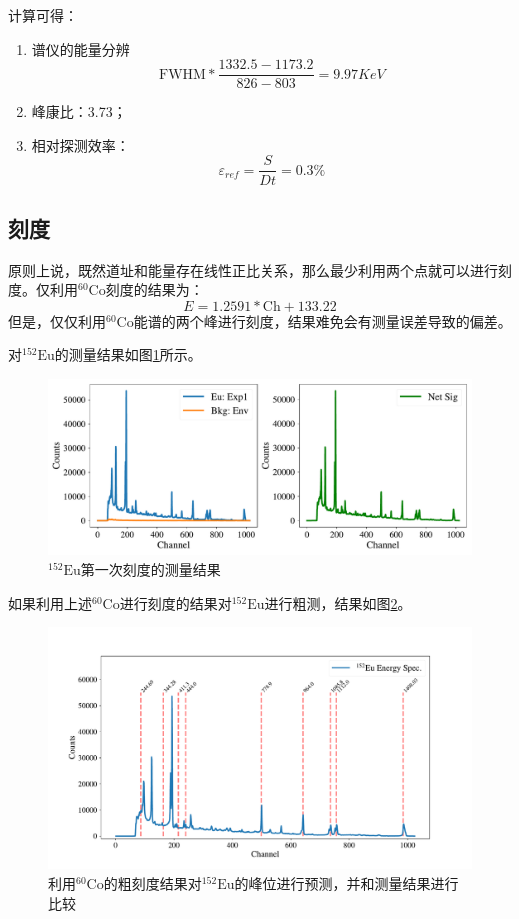 \documentclass{article}
\begin{document}
计算可得：
\begin{enumerate}
    \item 谱仪的能量分辨
    \begin{equation}
        \text{FWHM}*\frac{1332.5-1173.2}{826-803} = 9.97\si{KeV}
    \end{equation}
\item 峰康比：3.73；
\item 相对探测效率：
\begin{equation}
    \varepsilon_{ref} = \frac{S}{Dt} = 0.3\%
\end{equation}
\end{enumerate}
\subsection{刻度}
原则上说，既然道址和能量存在线性正比关系，那么最少利用两个点就可以进行刻度。仅利用$^{60}\text{Co}$刻度的结果为：
\begin{equation}
    E = 1.2591*\text{Ch} + 133.22
\end{equation}
但是，仅仅利用$^{60}\text{Co}$能谱的两个峰进行刻度，结果难免会有测量误差导致的偏差。

对$^{152}\text{Eu}$的测量结果如图\ref{fig:152Eu_Full}所示。
\begin{figure}[htbp]
    \centering
    \includegraphics[width=\textwidth]{../plots/Eu_full_net.pdf}
    \caption{$^{152}\text{Eu}$第一次刻度的测量结果\label{fig:152Eu_Full}}
\end{figure}

如果利用上述$^{60}\text{Co}$进行刻度的结果对$^{152}\text{Eu}$进行粗测，结果如图\ref{fig:Roughly_Cali_full}。
\begin{figure}
    \centering
    \includegraphics[width=\textwidth]{../plots/Roughly_Cali_full.pdf}
    \caption{利用$^{60}\text{Co}$的粗刻度结果对$^{152}\text{Eu}$的峰位进行预测，并和测量结果进行比较\label{fig:Roughly_Cali_full}}
\end{figure}
\end{document}
